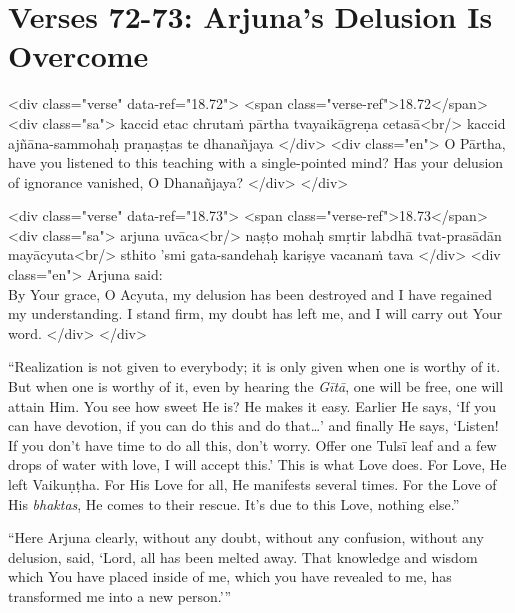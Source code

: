 \newpage
\section{Verses 72-73: Arjuna's Delusion Is Overcome}\label{sec-verses-72-73-arjuna-s-delusion-is-overcome}


\begin{html}
<div class="verse" data-ref="18.72">
  <span class="verse-ref">18.72</span>
  <div class="sa">
    kaccid etac chrutaṁ pārtha tvayaikāgreṇa cetasā<br/>
    kaccid ajñāna-sammohaḥ praṇaṣṭas te dhanañjaya
  </div>
  <div class="en">
    O Pārtha, have you listened to this teaching with a single-pointed mind? Has your delusion of ignorance vanished, O Dhanañjaya?
  </div>
</div>
\end{html}



\begin{html}
<div class="verse" data-ref="18.73">
  <span class="verse-ref">18.73</span>
  <div class="sa">
    arjuna uvāca<br/>
    naṣṭo mohaḥ smṛtir labdhā tvat-prasādān mayācyuta<br/>
    sthito ’smi gata-sandehaḥ kariṣye vacanaṁ tava
  </div>
  <div class="en">
    \hspace*{1em}Arjuna said: \\ By Your grace, O Acyuta, my delusion has been destroyed and I have regained my understanding. I stand firm, my doubt has left me, and I will carry out Your word.
  </div>
</div>
\end{html}


\enquote{Realization is not given to everybody; it is only given when one is worthy of it. But when one is worthy of it, even by hearing the \textit{Gītā}, one will be free, one will attain Him. You see how sweet He is? He makes it easy. Earlier He says, \enquote{If you can have devotion, if you can do this and do that\ldots} and finally He says, \enquote{Listen! If you don’t have time to do all this, don’t worry. Offer one Tulsī leaf and a few drops of water with love, I will accept this.} This is what Love does. For Love, He left Vaikuṇṭha. For His Love for all, He manifests several times. For the Love of His \textit{bhaktas}, He comes to their rescue. It’s due to this Love, nothing else.}

\enquote{Here Arjuna clearly, without any doubt, without any confusion, without any delusion, said, \enquote{Lord, all has been melted away. That knowledge and wisdom which You have placed inside of me, which you have revealed to me, has transformed me into a new person.}}

